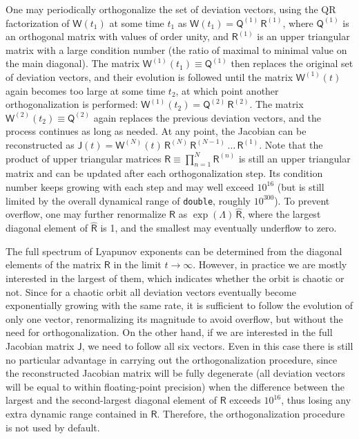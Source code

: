\documentclass[12pt]{article}
\begin{document}
One may periodically orthogonalize the set of deviation vectors, using the QR factorization of $\mathsf W(t_1)$ at some time $t_1$ as $\mathsf W(t_1) = \mathsf Q^{(1)}\, \mathsf R^{(1)}$, where $\mathsf Q^{(1)}$ is an orthogonal matrix with values of order unity, and $\mathsf R^{(1)}$ is an upper triangular matrix with a large condition number (the ratio of maximal to minimal value on the main diagonal). The matrix $\mathsf W^{(1)}(t_1) \equiv \mathsf Q^{(1)}$ then replaces the original set of deviation vectors, and their evolution is followed until the matrix $\mathsf W^{(1)}(t)$ again becomes too large at some time $t_2$, at which point another orthogonalization is performed: $\mathsf W^{(1)}(t_2) = \mathsf Q^{(2)}\, \mathsf R^{(2)}$. The matrix $\mathsf W^{(2)}(t_2) \equiv \mathsf Q^{(2)}$ again replaces the previous deviation vectors, and the process continues as long as needed. At any point, the Jacobian can be reconstructed as $\mathsf J (t) = \mathsf W^{(N)}(t) \, \mathsf R^{(N)}\, \mathsf R^{(N-1)}\, \dots\, \mathsf R^{(1)}$. Note that the product of upper triangular matrices $\mathsf R \equiv \prod_{n=1}^N \mathsf R^{(n)}$ is still an upper triangular matrix and can be updated after each orthogonalization step. Its condition number keeps growing with each step and may well exceed $10^{16}$ (but is still limited by the overall dynamical range of \texttt{double}, roughly $10^{300}$). To prevent overflow, one may further renormalize $\mathsf R$ as $\exp(\Lambda)\, \hat{\mathsf R}$, where the largest diagonal element of $\hat{\mathsf R}$ is 1, and the smallest may eventually underflow to zero.

The full spectrum of Lyapunov exponents can be determined from the diagonal elements of the matrix $\mathsf R$ in the limit $t\to \infty$. However, in practice we are mostly interested in the largest of them, which indicates whether the orbit is chaotic or not. Since for a chaotic orbit all deviation vectors eventually become exponentially growing with the same rate, it is sufficient to follow the evolution of only one vector, renormalizing its magnitude to avoid overflow, but without the need for orthogonalization. On the other hand, if we are interested in the full Jacobian matrix $\mathsf J$, we need to follow all six vectors. Even in this case there is still no particular advantage in carrying out the orthogonalization procedure, since the reconstructed Jacobian matrix will be fully degenerate (all deviation vectors will be equal to within floating-point precision) when the difference between the largest and the second-largest diagonal element of $\mathsf R$ exceeds $10^{16}$, thus losing any extra dynamic range contained in $\mathsf R$. Therefore, the orthogonalization procedure is not used by default.
\end{document}
